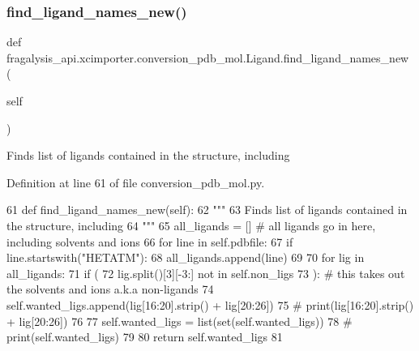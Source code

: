 \subsubsection{\texorpdfstring{find\+\_\+ligand\+\_\+names\+\_\+new()}{find\_ligand\_names\_new()}}
{\footnotesize\ttfamily def fragalysis\+\_\+api.\+xcimporter.\+conversion\+\_\+pdb\+\_\+mol.\+Ligand.\+find\+\_\+ligand\+\_\+names\+\_\+new (\begin{DoxyParamCaption}\item[{}]{self }\end{DoxyParamCaption})}

\begin{DoxyVerb}Finds list of ligands contained in the structure, including
\end{DoxyVerb}
 

Definition at line 61 of file conversion\+\_\+pdb\+\_\+mol.\+py.


\begin{DoxyCode}
61     \textcolor{keyword}{def }find\_ligand\_names\_new(self):
62         \textcolor{stringliteral}{"""}
63 \textcolor{stringliteral}{        Finds list of ligands contained in the structure, including}
64 \textcolor{stringliteral}{        """}
65         all\_ligands = []  \textcolor{comment}{# all ligands go in here, including solvents and ions}
66         \textcolor{keywordflow}{for} line \textcolor{keywordflow}{in} self.pdbfile:
67             \textcolor{keywordflow}{if} line.startswith(\textcolor{stringliteral}{"HETATM"}):
68                 all\_ligands.append(line)
69 
70         \textcolor{keywordflow}{for} lig \textcolor{keywordflow}{in} all\_ligands:
71             \textcolor{keywordflow}{if} (
72                 lig.split()[3][-3:] \textcolor{keywordflow}{not} \textcolor{keywordflow}{in} self.non\_ligs
73             ):  \textcolor{comment}{# this takes out the solvents and ions a.k.a non-ligands}
74                 self.wanted\_ligs.append(lig[16:20].strip() + lig[20:26])
75                 \textcolor{comment}{# print(lig[16:20].strip() + lig[20:26])}
76 
77         self.wanted\_ligs = list(set(self.wanted\_ligs))
78         \textcolor{comment}{# print(self.wanted\_ligs)}
79 
80         \textcolor{keywordflow}{return} self.wanted\_ligs
81 
\end{DoxyCode}
\mbox{\label{classfragalysis__api_1_1xcimporter_1_1conversion__pdb__mol_1_1_ligand_af0d3d0b75f9f10f0f50cba06017c4ba6}} 
